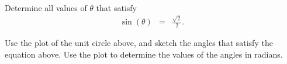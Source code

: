 
\begin{problem}
\item Determine all values of $\theta$ that satisfy
  \begin{eqnarray*}
    \sin(\theta) & = & \frac{\sqrt{2}}{2}.
  \end{eqnarray*}

  \begin{center}
  \end{center}

  Use the plot of the unit circle above, and sketch the angles that
  satisfy the equation above. Use the plot to determine the values of
  the angles in radians.

  \vfill

\end{problem}


